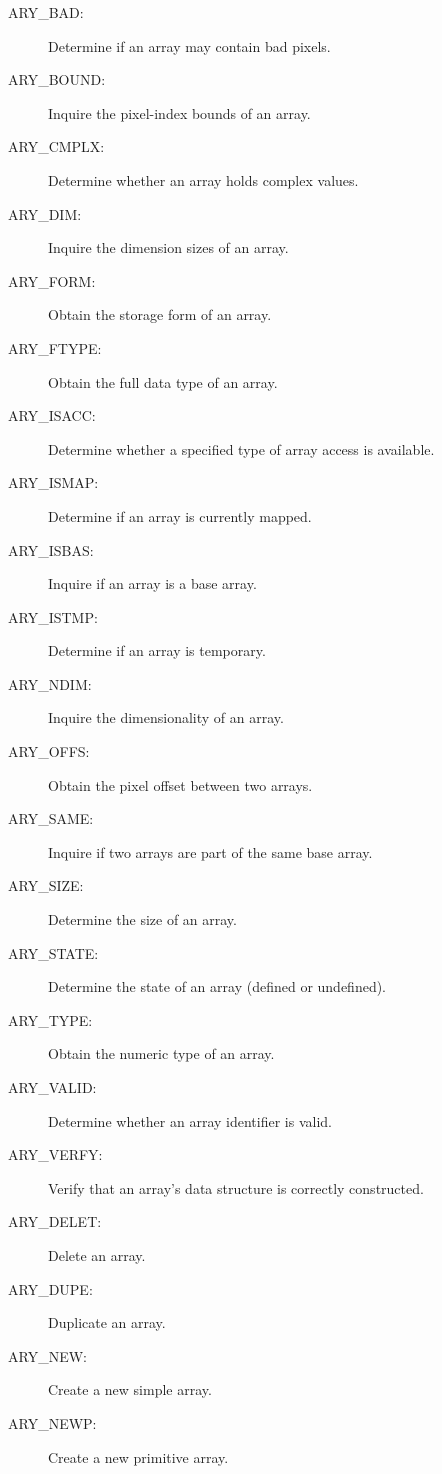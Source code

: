 \begin{description}
\begin{description}
\item [ARY\_BAD:]  Determine if an array may contain bad pixels.
\item [ARY\_BOUND:]  Inquire the pixel-index bounds of an array.
\item [ARY\_CMPLX:]  Determine whether an array holds complex values.
\item [ARY\_DIM:]  Inquire the dimension sizes of an array.
\item [ARY\_FORM:]  Obtain the storage form of an array.
\item [ARY\_FTYPE:]  Obtain the full data type of an array.
\item [ARY\_ISACC:]  Determine whether a specified type of array access is available.
\item [ARY\_ISMAP:]  Determine if an array is currently mapped.
\item [ARY\_ISBAS:]  Inquire if an array is a base array.
\item [ARY\_ISTMP:]  Determine if an array is temporary.
\item [ARY\_NDIM:]  Inquire the dimensionality of an array.
\item [ARY\_OFFS:]  Obtain the pixel offset between two arrays.
\item [ARY\_SAME:]  Inquire if two arrays are part of the same base array.
\item [ARY\_SIZE:]  Determine the size of an array.
\item [ARY\_STATE:]  Determine the state of an array (defined or undefined).
\item [ARY\_TYPE:]  Obtain the numeric type of an array.
\item [ARY\_VALID:]  Determine whether an array identifier is valid.
\item [ARY\_VERFY:]  Verify that an array's data structure is correctly constructed.
\end{description}

\item [Creating and deleting arrays ---]

\begin{description}
\item [ARY\_DELET:]  Delete an array.
\item [ARY\_DUPE:]  Duplicate an array.
\item [ARY\_NEW:]  Create a new simple array.
\item [ARY\_NEWP:]  Create a new primitive array.
\end{description}


\end{description}
